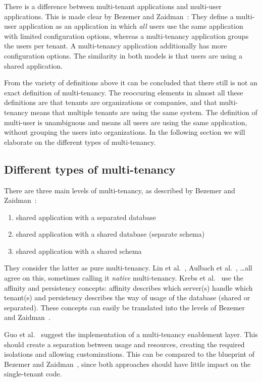 There is a difference between multi-tenant applications and multi-user applications. This is made clear by Bezemer and Zaidman~\cite{bezemer2010multi}: They define a multi-user application as an application in which \emph{all} users use the same application with limited configuration options, whereas a multi-tenancy application groups the users per tenant. A multi-tenancy application additionally has more configuration options. The similarity in both models is that users are using a shared application. %

From the variety of definitions above it can be concluded that there still is not an exact definition of multi-tenancy. The reoccuring elements in almost all these definitions are that tenants are organizations or companies, and that multi-tenancy means that multiple tenants are using the same system. The definition of multi-user is unambiguous and means all users are using the same application, without grouping the users into organizations. In the following section we will elaborate on the different types of multi-tenancy. 

\subsection{Different types of multi-tenancy}

There are three main levels of multi-tenancy, as described by Bezemer and Zaidman~\cite{bezemer2010multi}:
\begin{enumerate}
\item shared application with a separated database
\item shared application with a shared database (separate schema)
\item shared application with a shared schema
\end{enumerate}
They consider the latter as pure multi-tenancy. Lin et al.~\cite{lin2009feedback}, Aulbach et al.~\cite{aulbach2009comparison}, \ldots all agree on this, sometimes calling it \emph{native} multi-tenancy. Krebs et al.~\cite{krebs2012architecture} use the affinity and persistency concepts: affinity describes which server(s) handle which tenant(s) and persistency describes the way of usage of the database (shared or separated). These concepts can easily be translated into the levels of Bezemer and Zaidman~\cite{bezemer2010multi}. 


Guo et al.~\cite{guo2007framework} suggest the implementation of a multi-tenancy enablement layer. This should create a separation between usage and resources, creating the required isolations and allowing customizations. This can be compared to the blueprint of Bezemer and Zaidman~\cite{bezemer2010multi}, since both approaches should have little impact on the single-tenant code.

